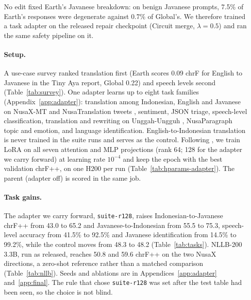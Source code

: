 \documentclass[11pt]{article}
\newcommand{\run}[1]{\texttt{#1}}
\begin{document}
No edit fixed Earth's Javanese breakdown: on benign Javanese prompts, 7.5\% of Earth's responses were degenerate
against 0.7\% of Global's. We therefore trained a task adapter on the released repair checkpoint (Circuit merge,
$\lambda = 0.5$) and ran the same safety pipeline on it.

\paragraph{Setup.} A use-case survey ranked translation first (Earth scores 0.09 chrF for English to Javanese in the
Tiny Aya report, Global 0.22) and speech levels second (Table~\ref{tab:survey}). One adapter learns up to eight task
families (Appendix~\ref{app:adapter}): translation among Indonesian, English and Javanese on NusaX-MT
\citep{winata2023nusax} and NusaTranslation tweets \citep{cahyawijaya2023nusawrites}, sentiment, JSON triage,
speech-level classification, translation and rewriting on Unggah-Ungguh \citep{farhansyah2025unggah}, NusaParagraph
topic and emotion, and language identification. English-to-Indonesian translation is never trained in the suite
runs and serves as the control. Following \citet{abdulmumin2026afriscience}, we train LoRA on all seven attention and MLP projections (rank
64; 128 for the adapter we carry forward) at learning rate $10^{-4}$ and keep the epoch with the best validation
chrF++, on one H200 per run (Table~\ref{tab:hparams-adapter}). The parent (adapter off) is scored in the same job.

\paragraph{Task gains.} The adapter we carry forward, \run{suite-r128}, raises Indonesian-to-Javanese chrF++ from
43.0 to 65.2 and Javanese-to-Indonesian from 55.5 to 75.3, speech-level accuracy from 41.5\% to 92.5\% and Javanese
identification from 14.5\% to 99.2\%, while the control moves from 48.3 to 48.2 (Table~\ref{tab:tasks}).
NLLB-200 3.3B, run as released, reaches 50.8 and 59.6 chrF++ on the two NusaX directions, a zero-shot reference
rather than a matched comparison (Table~\ref{tab:nllb}). Seeds and ablations are in Appendices~\ref{app:adapter} and~\ref{app:final}. The rule that chose \run{suite-r128} was set after the test table had been
seen, so the choice is not blind.
\end{document}
